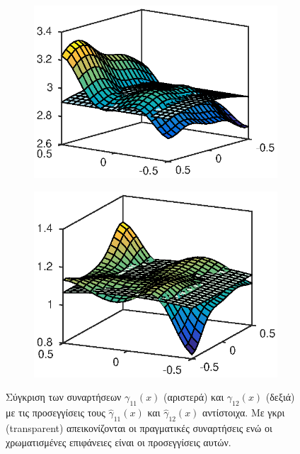 \begin{figure}
	\begin{subfigure}{0.5\textwidth}
		\includegraphics{plots/experiments/2dof/g11_hat.eps}
	\end{subfigure}
	\begin{subfigure}{0.5\textwidth}
		\includegraphics{plots/experiments/2dof/g12_hat.eps}
	\end{subfigure}
	\caption{Σύγκριση των συναρτήσεων $\gamma_{11}(x)$ (αριστερά) και $\gamma_{12}(x)$ (δεξιά) με τις προσεγγίσεις τους $\hat{\gamma}_{11}(x)$ και $\hat{\gamma}_{12}(x)$ αντίστοιχα. Με γκρι (transparent) απεικονίζονται οι πραγματικές συναρτήσεις ενώ οι χρωματισμένες επιφάνειες είναι οι προσεγγίσεις αυτών. }
	\label{fig:2dof_g1_approximations}
\end{figure}

